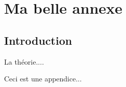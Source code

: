 \chapter{Ma belle annexe} \label{ANNEXE_1}

\section{Introduction}

La théorie....  \medskip

Ceci est une appendice...